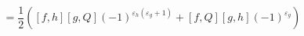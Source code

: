 \begin{equation}
=\frac{1}{2}\left(  [f,h][g,Q](-1)^{\varepsilon_{h}(\varepsilon_{g}%
+1)}+[f,Q][g,h](-1)^{\varepsilon_{g}}\right) \label{1.5}%
\end{equation}

